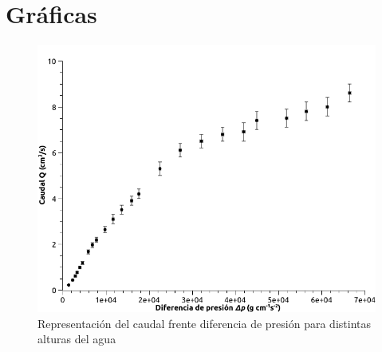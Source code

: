 \documentclass[a4paper,12pt,spanish]{article}
\begin{document}
	
	
	\section{Gráficas}
	
	
	
	\begin{figure}[H]
		\centering
		\includegraphics[width=0.9\linewidth]{graficas/caudal_presion}
		\caption{Representación del caudal frente diferencia de presión para distintas alturas del agua}
		\label{fig:caudalpresion}
	\end{figure}
	
\end{document}
